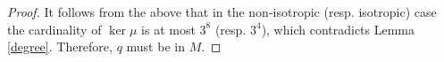 \documentclass[10pt,a4paper]{amsart}
\begin{document}
\begin{proof}
    It follows from the above that in the non-isotropic (resp. isotropic) case the cardinality of $\ker \mu$ is at most $3^8$ (resp. $3^4$), which contradicts Lemma \ref{degree}. Therefore, $q$ must be in $M$.
   

   
    
    \end{proof}
\end{document}
